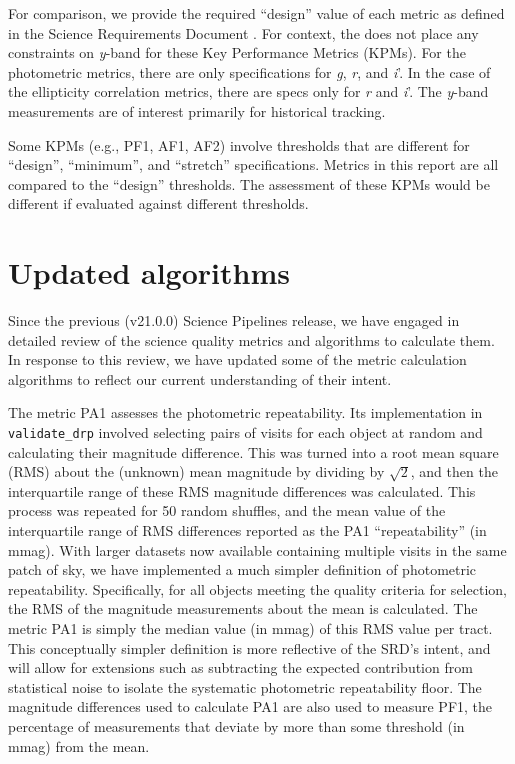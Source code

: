 \documentclass[DM, lsstdraft, toc]{lsstdoc}
\begin{document}
For comparison, we provide the \SRD required ``design'' value of each metric as defined in the Science Requirements Document .
For context, the \SRD does not place any constraints on \emph{y}-band for these Key Performance Metrics (KPMs).  For the photometric metrics, there are only specifications for \emph{g}, \emph{r}, and \emph{i}'. In the case of the ellipticity correlation metrics, there are specs only for \emph{r} and \emph{i}'. The \emph{y}-band measurements are of interest primarily for historical tracking.

Some KPMs (e.g., PF1, AF1, AF2) involve thresholds that are different for ``design'', ``minimum'', and ``stretch'' specifications. Metrics in this report are all compared to the ``design'' thresholds. The assessment of these KPMs would be different if evaluated against different thresholds.


\section{Updated algorithms}\label{sec:new_algorithms}

Since the previous (v21.0.0) Science Pipelines release, we have engaged in detailed review of the science quality metrics and algorithms to calculate them. In response to this review, we have updated some of the metric calculation algorithms to reflect our current understanding of their intent.

The metric PA1 assesses the photometric repeatability. Its implementation in \texttt{validate\_drp} involved selecting pairs of visits for each object at random and calculating their magnitude difference. This was turned into a root mean square (RMS) about the (unknown) mean magnitude by dividing by $\sqrt2$, and then the interquartile range of these RMS magnitude differences was calculated. This process was repeated for 50 random shuffles, and the mean value of the interquartile range of RMS differences reported as the PA1 ``repeatability'' (in mmag). With larger datasets now available containing multiple visits in the same patch of sky, we have implemented a much simpler definition of photometric repeatability. Specifically, for all objects meeting the quality criteria for selection, the RMS of the magnitude measurements about the mean is calculated. The metric PA1 is simply the median value (in mmag) of this RMS value per tract. This conceptually simpler definition is more reflective of the SRD's intent, and will allow for extensions such as subtracting the expected contribution from statistical noise to isolate the systematic photometric repeatability floor. The magnitude differences used to calculate PA1 are also used to measure PF1, the percentage of measurements that deviate by more than some threshold (in mmag) from the mean.
\end{document}
